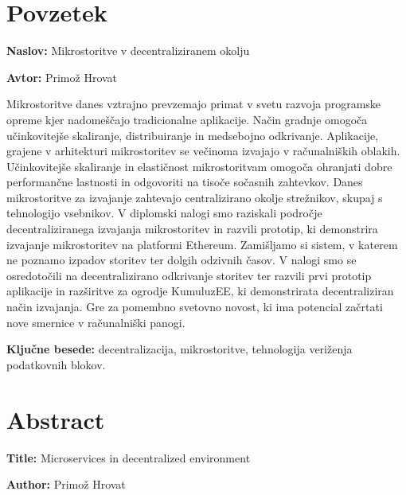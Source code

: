 \documentclass[a4paper, 12pt]{book}
\newcommand{\ttitle}{Mikrostoritve v decentraliziranem okolju}
\newcommand{\ttitleEn}{Microservices in decentralized environment}
\newcommand{\tauthor}{Primož Hrovat}
\newcommand{\tkeywords}{decentralizacija, mikrostoritve, tehnologija veriženja podatkovnih blokov}
\newcommand{\clearemptydoublepage}{\newpage{\pagestyle{empty}\cleardoublepage}}
\begin{document}
\clearemptydoublepage

\chapter*{Povzetek}

\noindent\textbf{Naslov:} \ttitle
\bigskip

\noindent\textbf{Avtor:} \tauthor
\bigskip

\noindent

Mikrostoritve danes vztrajno prevzemajo primat v svetu razvoja programske opreme kjer nadomeščajo tradicionalne aplikacije. 
Način gradnje omogoča učinkovitejše skaliranje, distribuiranje in medsebojno odkrivanje.
Aplikacije, grajene v arhitekturi mikrostoritev se večinoma izvajajo v ra\-ču\-nal\-ni\-ških oblakih.
Učinkovitejše skaliranje in elastičnost mikrostoritvam omogoča ohranjati dobre performančne lastnosti in odgovoriti na tisoče so\-časnih zahtevkov.
Danes mikrostoritve za izvajanje zahtevajo centralizirano okolje strežnikov, skupaj s tehnologijo vsebnikov.
V diplomski nalogi smo raziskali področje decentraliziranega izvajanja mikrostoritev in razvili prototip, ki demonstrira izvajanje mikrostoritev na platformi Ethereum.
Zamišljamo si sistem, v katerem ne poznamo izpadov storitev ter dolgih odzivnih časov.
V nalogi smo se osredotočili na decentralizirano odkrivanje storitev ter razvili prvi prototip aplikacije in razširitve za ogrodje KumuluzEE, ki demonstrirata decentraliziran način izvajanja.
Gre za pomembno svetovno novost, ki ima potencial začrtati nove smernice v računalniški panogi.

\bigskip

\noindent\textbf{Ključne besede:} \tkeywords.
\clearemptydoublepage

\chapter*{Abstract}

\noindent\textbf{Title:} \ttitleEn
\bigskip

\noindent\textbf{Author:} \tauthor
\bigskip

\noindent 
\end{document}
